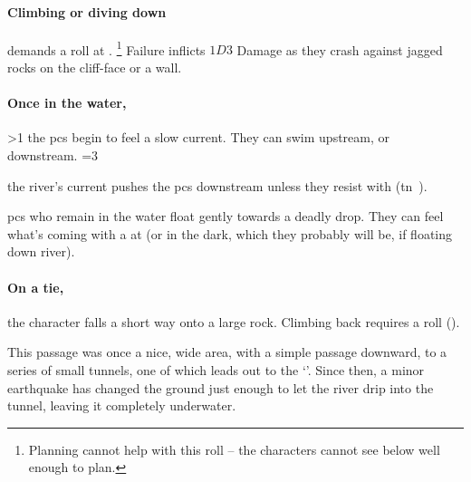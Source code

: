 \begin{multicols}{2}
\paragraph{Climbing or diving down}
demands a  roll at \tn[8].%
\footnote{Planning cannot help with this roll -- the characters cannot see below well enough to plan.}
Failure inflicts $1D3$ Damage as they crash against jagged rocks on the cliff-face or a wall.

\paragraph{Once in the water,}
\ifnum\value{temperature}>1%
  the \glspl{pc} begin to feel a slow current.
  They can swim upstream, or downstream.
\else%
  \ifnum\value{temperature}=3%
    \addtocounter{track}{2}%
  \fi%
  the river's current pushes the \glspl{pc} downstream unless they resist with  (\gls{tn}~).
\fi%

\playCommentaryDrowning[t]





\Glspl{pc} who remain in the water float gently towards a deadly drop.
They can feel what's coming with a  at \tn[7] (or \tn[10] in the dark, which they probably will be, if floating down river).

\paragraph{On a tie,}
the character falls a short way onto a large rock.
Climbing back requires a  roll (\tn[10]).




\begin{exampletext}
  This passage was once a nice, wide area, with a simple passage downward, to a series of small tunnels, one of which leads out to the `'.
  Since then, a minor earthquake has changed the ground just enough to let the river drip into the tunnel, leaving it completely underwater.
\end{exampletext}


\end{multicols}
